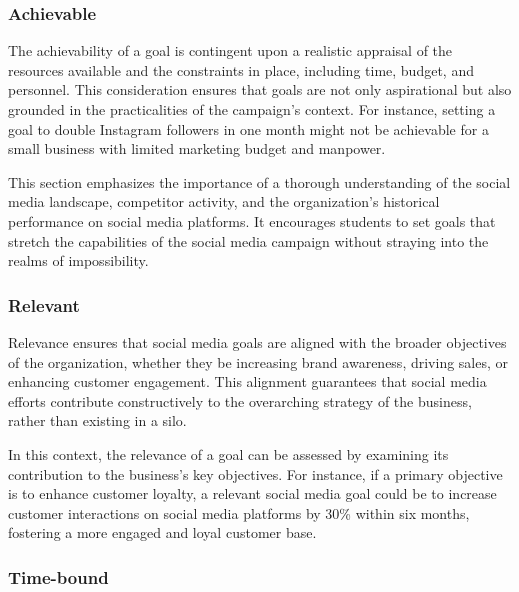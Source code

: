 \documentclass[
]{book}
\begin{document}
\hypertarget{achievable}{%
\subsubsection*{Achievable}\label{achievable}}

The achievability of a goal is contingent upon a realistic appraisal of the resources available and the constraints in place, including time, budget, and personnel. This consideration ensures that goals are not only aspirational but also grounded in the practicalities of the campaign's context. For instance, setting a goal to double Instagram followers in one month might not be achievable for a small business with limited marketing budget and manpower.

This section emphasizes the importance of a thorough understanding of the social media landscape, competitor activity, and the organization's historical performance on social media platforms. It encourages students to set goals that stretch the capabilities of the social media campaign without straying into the realms of impossibility.

\hypertarget{relevant}{%
\subsubsection*{Relevant}\label{relevant}}

Relevance ensures that social media goals are aligned with the broader objectives of the organization, whether they be increasing brand awareness, driving sales, or enhancing customer engagement. This alignment guarantees that social media efforts contribute constructively to the overarching strategy of the business, rather than existing in a silo.

In this context, the relevance of a goal can be assessed by examining its contribution to the business's key objectives. For instance, if a primary objective is to enhance customer loyalty, a relevant social media goal could be to increase customer interactions on social media platforms by 30\% within six months, fostering a more engaged and loyal customer base.

\hypertarget{time-bound}{%
\subsubsection*{Time-bound}\label{time-bound}}
\end{document}
